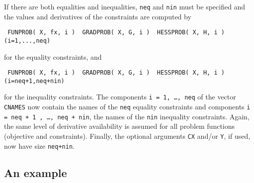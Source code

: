 \documentclass{article}
\begin{document}
If there are both equalities and inequalities, {\tt neq} and {\tt nin} must be
specified and the values and derivatives of the constraints are
computed by
\begin{lstlisting}
 FUNPROB( X, fx, i )  GRADPROB( X, G, i )  HESSPROB( X, H, i ) (i=1,...,neq)    \end{lstlisting}
\noindent
for the equality constraints, and
\begin{lstlisting}
 FUNPROB( X, fx, i )  GRADPROB( X, G, i )  HESSPROB( X, H, i ) (i=neq+1,neq+nin)
\end{lstlisting}
\noindent
for the inequality constraints. The
components {\tt i = 1, \ldots, neq} of the vector {\tt CNAMES}
now contain the names of the
{\tt neq} equality constraints and components {\tt i =  neq + 1 , \ldots ,
  neq + nin}, the names of the {\tt nin} inequality constraints.
Again, the same level of derivative
availability is assumed for all problem functions (objective and constraints).
Finally, the optional arguments {\tt CX} and/or {\tt Y}, if used, now have
size {\tt neq+nin}.

\subsection{An example}\label{ex_s}
\end{document}

